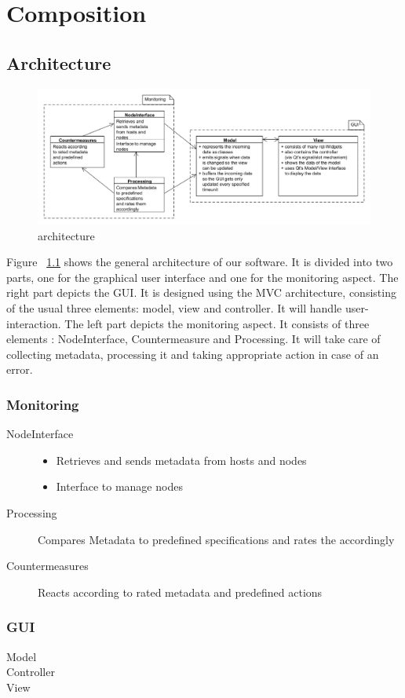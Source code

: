 \chapter{Composition}

\section{Architecture}

\begin{figure}[here]
\centering
\includegraphics[scale=0.5]{./bilder/architektur.png}
\caption{architecture}
\label{fig:architecture}
\end{figure}

Figure ~\ref{fig:architecture} shows the general architecture of our software. It is divided into two parts, one for the graphical user interface and one for the monitoring aspect.
The right part depicts the GUI. It is designed using the MVC architecture, consisting of the usual three elements: model, view and controller. It will handle user-interaction.
The left part depicts the monitoring aspect. It consists of three elements : NodeInterface, Countermeasure and Processing. It will take care of collecting metadata, processing it and taking appropriate action in case of an error.

\subsection{Monitoring}

\begin{description}
	\item[NodeInterface]
		\begin{itemize}
			\item Retrieves and sends metadata from hosts and nodes
			\item Interface to manage nodes
		\end{itemize}
	\item[Processing] Compares Metadata to predefined specifications and rates the accordingly
	\item[Countermeasures] Reacts according to rated metadata and predefined actions	
\end{description}

\subsection{GUI}

\begin{description}
	\item[Model]
	\item[Controller]
	\item[View]
\end{description}
